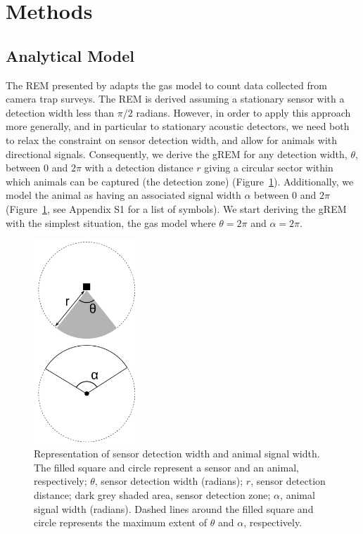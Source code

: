 \section{Methods}

\subsection{Analytical Model}

The REM presented by \cite{rowcliffe2008estimating} adapts the gas model to count data collected from camera trap surveys.
The REM is derived assuming a stationary sensor with a detection width less than $\pi/2$ radians.
However, in order to apply this approach more generally, and in particular to stationary acoustic detectors, we need both to relax the constraint on sensor detection width, and allow for animals with directional signals.
Consequently, we derive the gREM for any detection width, $ \theta$, between 0 and $2\pi$ with a detection distance $r$ giving a circular sector within which animals can be captured (the detection zone) (Figure~\ref{f:AngleDef}).
Additionally, we model the animal as having an associated signal width $\alpha$ between 0 and $2\pi$  (Figure~\ref{f:AngleDef}, see Appendix S1 for a list of symbols).
We start deriving the gREM with the simplest situation, the gas model where $\theta =  2\pi$ and $ \alpha =  2\pi$. 



\begin{figure}[t]
        \centering
	\includegraphics[width=4cm]{imgs/lucas_et_al_figure1.pdf}

\caption[Representation of sensor detection width and animal signal width]{
Representation of sensor detection width and animal signal width.
The filled square and circle represent a sensor and an animal, respectively; $\theta$, sensor detection width (radians); $r$, sensor detection distance; dark grey shaded area, sensor detection zone; $\alpha$, animal signal width (radians).
Dashed lines around the filled square and circle represents the maximum extent of $\theta$ and $\alpha$, respectively.} 
\label{f:AngleDef}
\end{figure}



